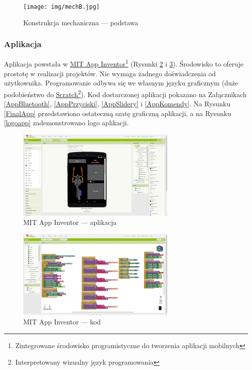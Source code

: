 \documentclass[11pt,titlepage]{article}
\begin{document}
\begin{figure}[p]
    \begin{center}
        \texttt{[image: img/mechB.jpg]}
    \end{center}
    \caption{Konstrukcja mechaniczna — podstawa}
    \label{mechB}
\end{figure}

\newpage

\subsubsection{Aplikacja}

Aplikacja powstała w \href{https://appinventor.mit.edu}{\underline{MIT App Inventor}}\footnote{Zintegrowane środowisko programistyczne do tworzenia aplikacji mobilnych} (Rysunki \ref{MITapp} i \ref{MITblocks}). Środowisko to oferuje prostotę w realizacji projektów. Nie wymaga żadnego doświadczenia od użytkownika. Programowanie odbywa się we własnym języku graficznym (duże podobieństwo do \href{https://scratch.mit.edu}{\underline{Scratch}}\footnote{Interpretowany wizualny język programowania}). Kod dostarczonej aplikacji pokazano na Załącznikach \ref{AppBluetooth}, \ref{AppPrzyciski}, \ref{AppSlidery} i \ref{AppKomendy}. Na Rysunku \ref{FinalApp} przedstawiono ostateczną szatę graficzną aplikacji, a na Rysunku \ref{logoapp} zademonstrowano logo aplikacji.

\begin{figure}[h!]
    \begin{center}
        \includegraphics[width=0.7\textwidth]{img/app_src/MITapp.png}
    \end{center}
    \caption{MIT App Inventor — aplikacja}
    \label{MITapp}
\end{figure}

\begin{figure}[h!]
    \begin{center}
        \includegraphics[width=0.7\textwidth]{img/app_src/MITblocks.png}
    \end{center}
    \caption{MIT App Inventor — kod}
    \label{MITblocks}
\end{figure}
\end{document}
